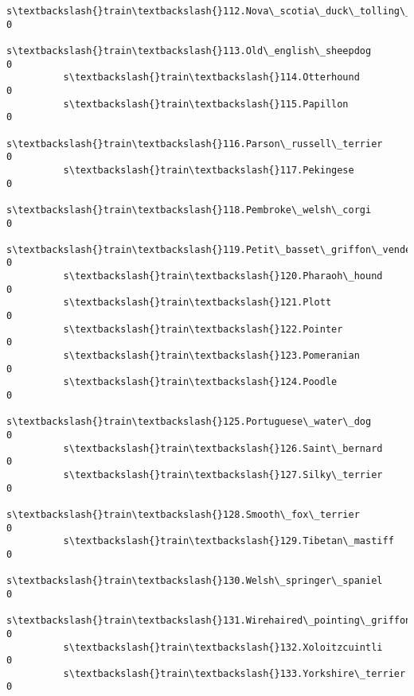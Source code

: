 \documentclass[11pt]{article}
\begin{document}
\begin{Verbatim}[commandchars=\\\{\}]
          s\textbackslash{}train\textbackslash{}112.Nova\_scotia\_duck\_tolling\_retriever                                           0   
          s\textbackslash{}train\textbackslash{}113.Old\_english\_sheepdog                                                         0   
          s\textbackslash{}train\textbackslash{}114.Otterhound                                                                   0   
          s\textbackslash{}train\textbackslash{}115.Papillon                                                                     0   
          s\textbackslash{}train\textbackslash{}116.Parson\_russell\_terrier                                                       0   
          s\textbackslash{}train\textbackslash{}117.Pekingese                                                                    0   
          s\textbackslash{}train\textbackslash{}118.Pembroke\_welsh\_corgi                                                         0   
          s\textbackslash{}train\textbackslash{}119.Petit\_basset\_griffon\_vendeen                                                 0   
          s\textbackslash{}train\textbackslash{}120.Pharaoh\_hound                                                                0   
          s\textbackslash{}train\textbackslash{}121.Plott                                                                        0   
          s\textbackslash{}train\textbackslash{}122.Pointer                                                                      0   
          s\textbackslash{}train\textbackslash{}123.Pomeranian                                                                   0   
          s\textbackslash{}train\textbackslash{}124.Poodle                                                                       0   
          s\textbackslash{}train\textbackslash{}125.Portuguese\_water\_dog                                                         0   
          s\textbackslash{}train\textbackslash{}126.Saint\_bernard                                                                0   
          s\textbackslash{}train\textbackslash{}127.Silky\_terrier                                                                0   
          s\textbackslash{}train\textbackslash{}128.Smooth\_fox\_terrier                                                           0   
          s\textbackslash{}train\textbackslash{}129.Tibetan\_mastiff                                                              0   
          s\textbackslash{}train\textbackslash{}130.Welsh\_springer\_spaniel                                                       0   
          s\textbackslash{}train\textbackslash{}131.Wirehaired\_pointing\_griffon                                                  0   
          s\textbackslash{}train\textbackslash{}132.Xoloitzcuintli                                                               0   
          s\textbackslash{}train\textbackslash{}133.Yorkshire\_terrier                                                            0   
          

\end{Verbatim}
\end{document}
